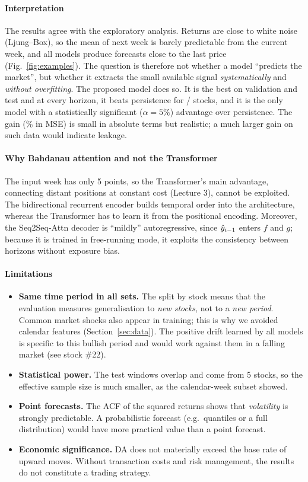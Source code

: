 \paragraph{Interpretation}
The results agree with the exploratory analysis. Returns are close to white noise (Ljung--Box), so the mean of next week is barely predictable from the current week, and all models produce forecasts close to the last price (Fig.~\ref{fig:examples}). The question is therefore not whether a model ``predicts the market'', but whether it extracts the small available signal \emph{systematically} and \emph{without overfitting}. The proposed model does so. It is the best on validation and test and at every horizon, it beats persistence for \PropBeatsPersStocks/\NtestStocks{} stocks, and it is the only model with a statistically significant ($\alpha=5\%$) advantage over persistence. The gain (\PropGain\% in MSE) is small in absolute terms but realistic; a much larger gain on such data would indicate leakage.

\paragraph{Why Bahdanau attention and not the Transformer}
The input week has only 5 points, so the Transformer's main advantage, connecting distant positions at constant cost (Lecture 3), cannot be exploited. The bidirectional recurrent encoder builds temporal order into the architecture, whereas the Transformer has to learn it from the positional encoding. Moreover, the Seq2Seq-Attn decoder is ``mildly'' autoregressive, since $\hat{y}_{i-1}$ enters $f$ and $g$; because it is trained in free-running mode, it exploits the consistency between horizons without exposure bias.

\paragraph{Limitations}
\begin{itemize}[leftmargin=*]
  \item \textbf{Same time period in all sets.} The split by stock means that the evaluation measures generalisation to \emph{new stocks}, not to a \emph{new period}. Common market shocks also appear in training; this is why we avoided calendar features (Section~\ref{sec:data}). The positive drift learned by all models is specific to this bullish period and would work against them in a falling market (see stock \#22).
  \item \textbf{Statistical power.} The \Ntest{} test windows overlap and come from 5 stocks, so the effective sample size is much smaller, as the calendar-week subset showed.
  \item \textbf{Point forecasts.} The ACF of the squared returns shows that \emph{volatility} is strongly predictable. A probabilistic forecast (e.g.\ quantiles or a full distribution) would have more practical value than a point forecast.
  \item \textbf{Economic significance.} DA does not materially exceed the base rate of upward moves. Without transaction costs and risk management, the results do not constitute a trading strategy.
\end{itemize}

